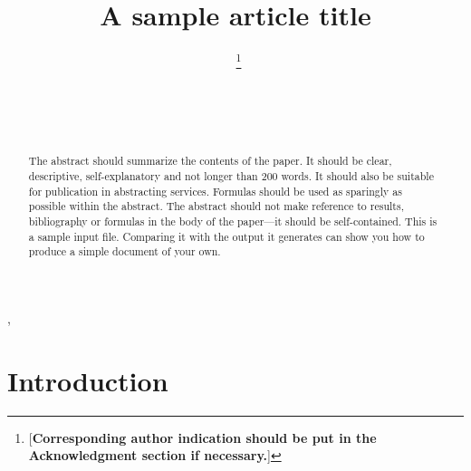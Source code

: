 \documentclass[bj,authoryear]{imsart}
\theoremstyle{plain}
\theoremstyle{definition}
\begin{document}
\begin{frontmatter}
\title{A sample article title}

\begin{aug}
\author[A]{~\thanks{[\textbf{Corresponding author indication should be put in the Acknowledgment section if necessary.}]}},
\author[B]{~}
\author[B]{~}
\address[A]{Department,
University or Company Name, City, Country}

\address[B]{Department,
University or Company Name, City, Country}
\end{aug}

\begin{abstract}
The abstract should summarize the contents of the paper.
It should be clear, descriptive, self-explanatory and not longer
than 200 words. It should also be suitable for publication in
abstracting services. Formulas should be used as sparingly as
possible within the abstract. The abstract should not make
reference to results, bibliography or formulas in the body
of the paper---it should be self-contained.
This is a sample input file.  Comparing it with the output it
generates can show you how to produce a simple document of
your own.
\end{abstract}

\begin{keyword}
\end{keyword}

\end{frontmatter}

\section{Introduction}
\end{document}
